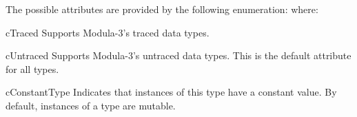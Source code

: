 The possible attributes are provided by the following enumeration:
where:
\begin{Description}
\item [cTraced] Supports Modula-3's traced data types.  
\item [cUntraced] Supports Modula-3's untraced data types.  This is the
default attribute for all types.


\item [cConstantType] Indicates that instances of this type have a constant
value.  By default, instances of a type are mutable.


\end{Description}
